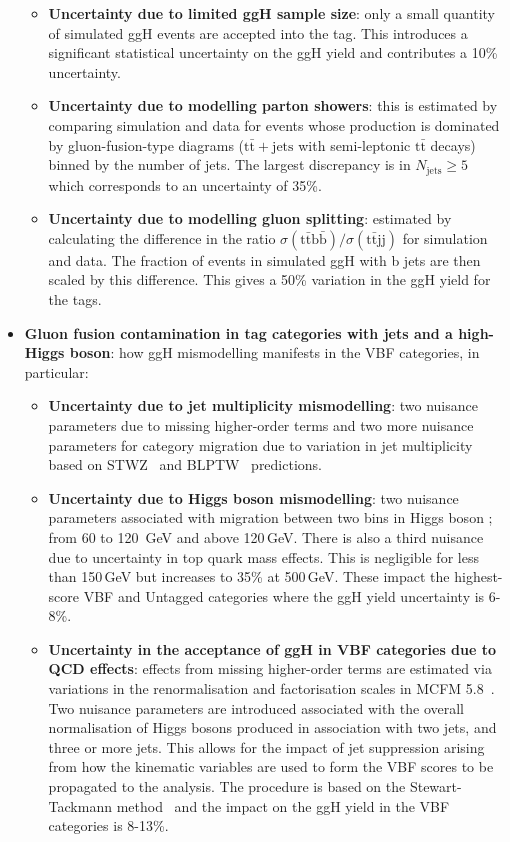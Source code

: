 \begin{itemize}[noitemsep]
{        \begin{itemize}[noitemsep]
            \item[\textbullet] \textbf{Uncertainty due to limited ggH sample size}: only a small quantity of simulated ggH events are accepted into the \ttH tag. This introduces a significant statistical uncertainty on the ggH yield and contributes a 10\% uncertainty.
            \item[\textbullet] \textbf{Uncertainty due to modelling parton showers}: this is estimated by comparing simulation and data for events whose production is dominated by gluon-fusion-type diagrams ($\mathrm{t}\bar{\mathrm{t}}+\mathrm{jets}$ with semi-leptonic $\mathrm{t}\bar{\mathrm{t}}$ decays) binned by the number of jets. The largest discrepancy is in $N_{\mathrm{jets}}\geq{5}$ which corresponds to an uncertainty of 35\%.
            \item[\textbullet] \textbf{Uncertainty due to modelling gluon splitting}: estimated by calculating the difference in the ratio $\sigma(\mathrm{t\bar{t}b\bar{b}})/\sigma(\mathrm{t\bar{t}jj})$ for simulation and data. The fraction of events in simulated ggH with b jets are then scaled by this difference. This gives a 50\% variation in the ggH yield for the \ttH tags. 
        \end{itemize}}
    \item{\textbf{Gluon fusion contamination in tag categories with jets and a high-\pt Higgs boson}: how ggH mismodelling manifests in the VBF categories, in particular:
        \begin{itemize}[noitemsep]
            \item[\textbullet] \textbf{Uncertainty due to jet multiplicity mismodelling}: two nuisance parameters due to missing higher-order terms and two more nuisance parameters for category migration due to variation in jet multiplicity based on STWZ~\cite{JetPtResum} and BLPTW~\cite{JetPtResum,TheoryUncertHiggs1J,ResummedHiggsPredictions} predictions. 
            \item[\textbullet] \textbf{Uncertainty due to Higgs boson \pt mismodelling}: two nuisance parameters associated with migration between two bins in Higgs boson \pt; from 60 to 120 \,GeV and above 120\,GeV. There is also a third nuisance due to uncertainty in top quark mass effects. This is negligible for \pt less than 150\,GeV but increases to 35\% at 500\,GeV. These impact the highest-score VBF and Untagged categories where the ggH yield uncertainty is 6-8\%.
            \item[\textbullet] \textbf{Uncertainty in the acceptance of ggH in VBF categories due to QCD effects}: effects from missing higher-order terms are estimated via variations in the renormalisation and factorisation scales in MCFM 5.8~\cite{MCFM}. Two nuisance parameters are introduced associated with the overall normalisation of Higgs bosons produced in association with two jets, and three or more jets. This allows for the impact of jet suppression arising from how the kinematic variables are used to form the VBF scores to be propagated to the analysis. The procedure is based on the Stewart-Tackmann method~\cite{StewartTackmann,GangalTackmann} and the impact on the ggH yield in the VBF categories is 8-13\%. 

\end{itemize}}
\end{itemize}
